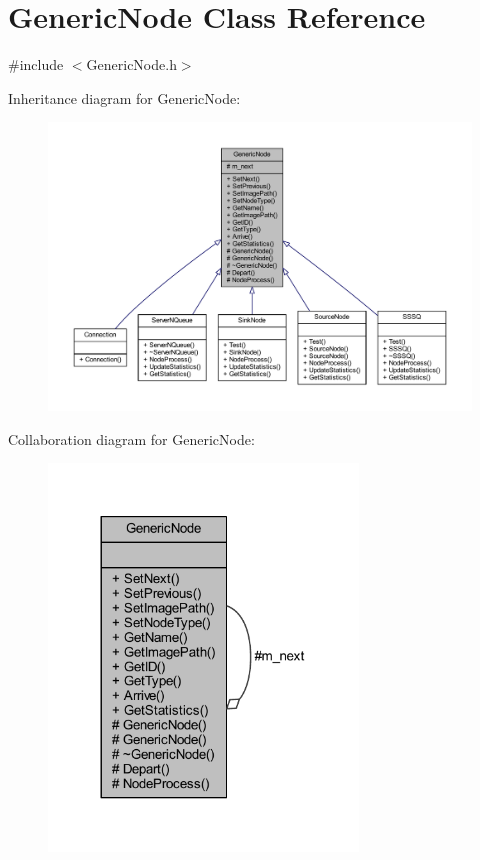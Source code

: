 \hypertarget{class_generic_node}{}\section{Generic\+Node Class Reference}
\label{class_generic_node}


{\ttfamily \#include $<$Generic\+Node.\+h$>$}



Inheritance diagram for Generic\+Node\+:
\nopagebreak
\begin{figure}[H]
\begin{center}
\leavevmode
\includegraphics[width=350pt]{class_generic_node__inherit__graph}
\end{center}
\end{figure}


Collaboration diagram for Generic\+Node\+:
\nopagebreak
\begin{figure}[H]
\begin{center}
\leavevmode
\includegraphics[width=233pt]{class_generic_node__coll__graph}
\end{center}
\end{figure}
